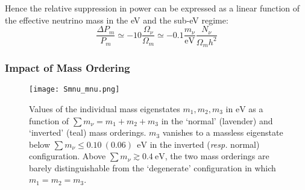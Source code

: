 Hence the relative suppression in power can be expressed as a linear function of the effective neutrino mass in the eV and the sub-eV regime:\\

\begin{equation}
\frac{\Delta P_m}{P_m} \simeq - 10\frac{\Omega_\nu}{\Omega_m} \simeq - 0.1 \frac{m_\nu}{\mathrm{eV}} \frac{N_\nu}{\Omega_m h^2}
\end{equation}


\subsubsection{Impact of Mass Ordering}
\label{sec:mass_ordering}

\begin{figure}
\begin{center}
\texttt{[image: Smnu\_mnu.png]}
\caption{Values of the individual mass eigenstates $m_1, m_2, m_3$ in $\mathrm{eV}$ as a function of $\sum m_\nu = m_1 + m_2 + m_3$ in the `normal' (lavender) and `inverted' (teal) mass orderings. $m_3$ vanishes to a massless eigenstate below $\sum m_\nu \leq 0.10~(0.06)~~\mathrm{eV}$ in the inverted (\textit{resp.} normal) configuration. Above $\sum m_\nu \gtrsim 0.4~\mathrm{eV}$, the two mass orderings are barely distinguishable from the `degenerate' configuration in which $m_1 = m_2 = m_3$.}
\label{fig:smnu_mnu}
\end{center}
\end{figure}


